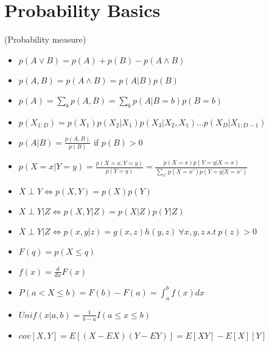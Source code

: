 \documentclass[10pt,twocolumn]{article}
\newenvironment{props}[1][Properties]{\begin{trivlist}
\item[\hskip \labelsep {\bfseries #1}]}{\end{trivlist}}
\begin{document}
\section*{Probability Basics}


\begin{props} 
    (Probability measure)
	\begin{itemize}
	  \item $p(A\vee B) = p(A) + p(B) - p(A\wedge B)$ 
	  \item $p(A, B) = p(A \wedge B) = p(A|B)p(B)$ 
	  \item $p(A) = \sum\limits_b p(A, B) = \sum\limits_b p(A|B=b)p(B=b)$  
	  \item $p(X_{1:D}) = p(X_1)p(X_2|X_1)p(X_3|X_2,X_1)...p(X_D|X_{1:D-1})$ 
	  \item $p(A|B) = \frac{p(A, B)}{p(B)}$ if $p(B)>0$ 
	  \item $p(X=x|Y=y)=\frac{p(X=x, Y=y)}{p(Y=y)} = \frac{p(X=x)p(Y=y|X=x)}{\sum_{x'}p(X=x')p(Y=y|X=x')}$ 
	  \item $ X\perp Y \Longleftrightarrow p(X, Y)=p(X)p(Y)$ 
	  \item $X\perp Y | Z \Longleftrightarrow p(X, Y|Z) = p(X|Z)p(Y|Z)$ 
	  \item $X\perp Y|Z  \Longleftrightarrow p(x,y|z)=g(x,z)h(y,z)\ \forall x,y,z\ s.t\ p(z) > 0$
	  \item $ F(q) = p(X \leq q)$ 
	  \item $ f(x) = \frac{d}{dx} F(x)$
	  \item $P(a< X \leq b) = F(b) - F(a) = \int^b_a f(x) dx $ 
	  \item $Unif(x|a,b) = \frac{1}{b-a}I(a \leq x \leq b)$ 
	  \item $cov[X,Y] = E[(X-EX)(Y-EY)]=E[XY] - E[X][Y]$ 
	\end{itemize}
\end{props}
\end{document}
